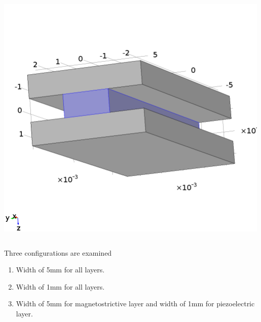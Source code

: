 \documentclass[compress]{beamer}
\begin{document}
\begin{frame}
{\begin{columns}[totalwidth=\textwidth]
\begin{column}{.35\textwidth}
 \includegraphics[width=0.99\textwidth]{Graphic/03_geo_Iform}
 \end{column}
 \end{columns}
 }
 \begin{exampleblock}{Three configurations are examined}
\begin{enumerate}[label=\Alph*., font=\small, leftmargin=*]
\item Width of 5mm for all layers.
\item Width of 1mm for all layers.
\item Width of 5mm for magnetostrictive layer and width of 1mm for piezoelectric layer.
\end{enumerate}
\end{exampleblock}
\end{frame}
\end{document}
